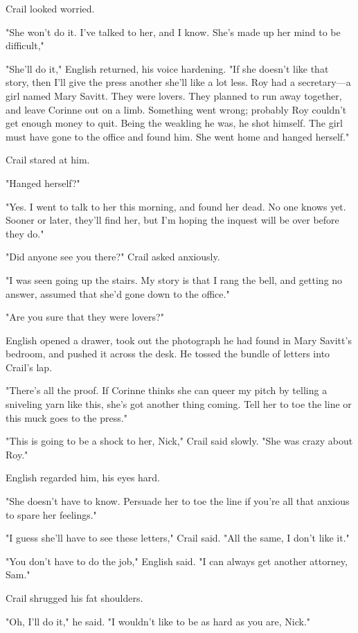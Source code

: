 \documentclass{novel}
\begin{document}
Crail looked worried.

"She won't do it. I've talked to her, and I know. She's made up her mind to be difficult,"

"She'll do it," English returned, his voice hardening. "If she doesn't like that story, then I'll give the press another she'll like a lot less. Roy had a secretary—a girl named Mary Savitt. They were lovers. They planned to run away together, and leave Corinne out on a limb. Something went wrong; probably Roy couldn't get enough money to quit. Being the weakling he was, he shot himself. The girl must have gone to the office and found him. She went home and hanged herself."

Crail stared at him.

"Hanged herself?"

"Yes. I went to talk to her this morning, and found her dead. No one knows yet. Sooner or later, they'll find her, but I'm hoping the inquest will be over before they do."

"Did anyone see you there?" Crail asked anxiously.

"I was seen going up the stairs. My story is that I rang the bell, and getting no answer, assumed that she'd gone down to the office."

"Are you sure that they were lovers?"

English opened a drawer, took out the photograph he had found in Mary Savitt's bedroom, and pushed it across the desk. He tossed the bundle of letters into Crail's lap.

"There's all the proof. If Corinne thinks she can queer my pitch by telling a sniveling yarn like this, she's got another thing coming. Tell her to toe the line or this muck goes to the press."

"This is going to be a shock to her, Nick," Crail said slowly. "She was crazy about Roy."

English regarded him, his eyes hard.

"She doesn't have to know. Persuade her to toe the line if you're all that anxious to spare her feelings."

"I guess she'll have to see these letters," Crail said. "All the same, I don't like it."

"You don't have to do the job," English said. "I can always get another attorney, Sam."

Crail shrugged his fat shoulders.

"Oh, I'll do it," he said. "I wouldn't like to be as hard as you are, Nick."
\end{document}
